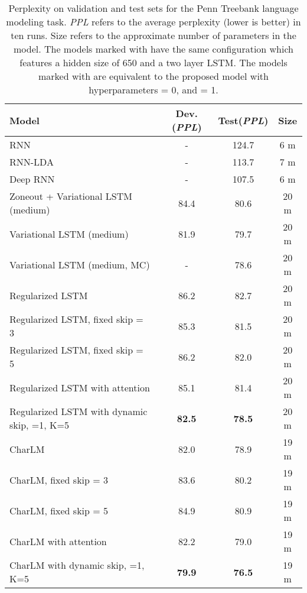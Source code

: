 \documentclass[letterpaper]{article} \usepackage{aaai19}  \usepackage{times}  \usepackage{helvet}  \usepackage{courier}  \usepackage{url}  \usepackage{graphicx}  \usepackage{amsmath}
\begin{document}
\begin{table*}[t]
\centering
\begin{tabular}{l|c|c|c}
\hline
  \textbf{Model}  & \textbf{Dev.}(\textit{PPL}) & \textbf{Test}(\textit{PPL}) & \textbf{Size}\\
  \hline
  RNN~\cite{mikolov2012context} & - & 124.7 & 6 m\\
  RNN-LDA~\cite{mikolov2012context} & - & 113.7 & 7 m\\
  Deep RNN~\cite{pascanu2013construct} & - & 107.5 & 6 m\\
  Zoneout + Variational LSTM (medium)~\cite{merity2016pointer} & 84.4 & 80.6 & 20 m\\
  Variational LSTM (medium)~\cite{gal2016theoretically} & 81.9 & 79.7 & 20 m\\
  Variational LSTM (medium, MC)~\cite{gal2016theoretically} & - & 78.6 & 20 m\\
  \hline
  \hline
  Regularized LSTM~\cite{zaremba2014recurrent} & 86.2 & 82.7 & 20 m \\
  Regularized LSTM, fixed skip = 3~\cite{zhang2016architectural} & 85.3 & 81.5 & 20 m \\
  Regularized LSTM, fixed skip = 5~\cite{zhang2016architectural} & 86.2 & 82.0 & 20 m \\
  Regularized LSTM with attention & 85.1 & 81.4 & 20 m \\
Regularized LSTM with dynamic skip, =1, K=5 & \textbf{82.5} & \textbf{78.5} & 20 m \\
  \hline
  \hline
  CharLM~\cite{kim2016character} & 82.0 & 78.9 & 19 m \\
  CharLM, fixed skip = 3~\cite{zhang2016architectural} & 83.6 & 80.2 & 19 m \\
  CharLM, fixed skip = 5~\cite{zhang2016architectural} & 84.9 & 80.9& 19 m \\
  CharLM with attention & 82.2 & 79.0 & 19 m \\
CharLM with dynamic skip, =1, K=5 & \textbf{79.9} & \textbf{76.5} & 19 m \\
  \hline
\end{tabular}
\caption{Perplexity on validation and test sets for the Penn Treebank language modeling task. \textit{PPL} refers to the average perplexity (lower is better) in ten runs. Size refers to the approximate number of parameters in the model. The models marked with  have the same configuration which features a hidden size of 650 and a two layer LSTM. The models marked with  are equivalent to the proposed model with hyperparameters  = 0, and  = 1.}
  \label{tab:LM}
\end{table*}
\end{document}
